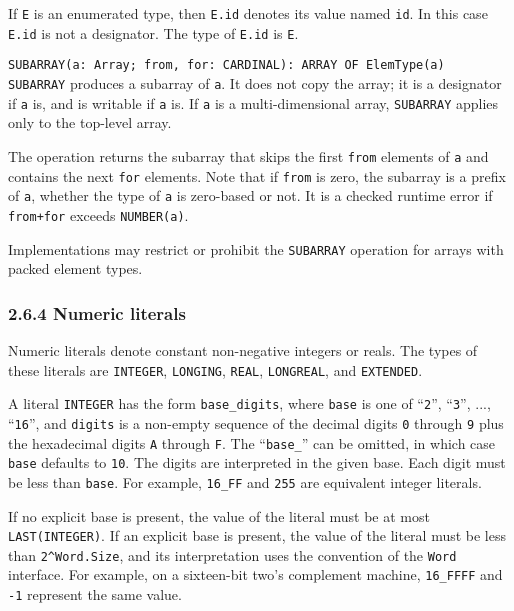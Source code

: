 \documentclass[10pt]{article}
\begin{document}
\begin{description}
  If \verb|E| is an enumerated type, then \verb|E.id| denotes its value named
  \verb|id|.  In this case \verb|E.id| is not a designator.  The type of
  \verb|E.id| is \verb|E|.
\item \verb|SUBARRAY(a: Array; from, for: CARDINAL): ARRAY OF ElemType(a)| \\
  \verb|SUBARRAY| produces a subarray of \verb|a|.  It does not copy the
  array; it is a designator if \verb|a| is, and is writable if \verb|a| is.
  If \verb|a| is a multi-dimensional array, \verb|SUBARRAY| applies only to
  the top-level array.

  The operation returns the subarray that skips the first \verb|from| elements
  of \verb|a| and contains the next \verb|for| elements.  Note that if
  \verb|from| is zero, the subarray is a prefix of \verb|a|, whether the type
  of \verb|a| is zero-based or not.  It is a checked runtime error if
  \verb|from+for| exceeds \verb|NUMBER(a)|.

  Implementations may restrict or prohibit the \verb|SUBARRAY| operation for
  arrays with packed element types.
\end{description}

\subsubsection*{2.6.4 Numeric literals}

Numeric literals denote constant non-negative integers or reals.  The types of
these literals are \verb|INTEGER|, \verb|LONGING|, \verb|REAL|,
\verb|LONGREAL|, and \verb|EXTENDED|.

A literal \verb|INTEGER| has the form \verb|base_digits|, where \verb|base| is
one of ``\verb|2|'', ``\verb|3|'', ..., ``\verb|16|'', and \verb|digits| is a
non-empty sequence of the decimal digits \verb|0| through \verb|9| plus the
hexadecimal digits \verb|A| through \verb|F|.  The ``\verb|base_|'' can be
omitted, in which case \verb|base| defaults to \verb|10|.  The digits are
interpreted in the given base.  Each digit must be less than \verb|base|.  For
example, \verb|16_FF| and \verb|255| are equivalent integer literals.

If no explicit base is present, the value of the literal must be at most
\verb|LAST(INTEGER)|.  If an explicit base is present, the value of the
literal must be less than \verb|2^Word.Size|, and its interpretation uses the
convention of the \verb|Word| interface.  For example, on a sixteen-bit two's
complement machine, \verb|16_FFFF| and \verb|-1| represent the same value.
\end{document}
